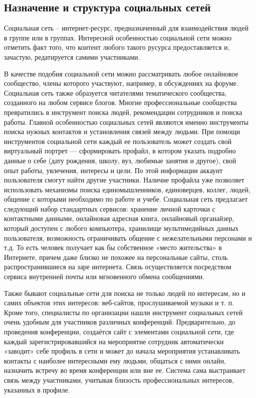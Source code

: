 \subsection{Назначение и структура социальных сетей}
\label{sec:analysis:structure}

Социальная сеть -- интернет-ресурс, предназначенный для взаимодействия людей в группе или в группах. Интересной особенностью социальной сети можно отметить факт того, что контент любого такого русурса предоставляется и, зачастую, редатируется самими участниками.

В качестве подобия социальной сети можно рассматривать любое онлайновое сообщество, члены которого участвуют, например, в обсуждениях на форуме. Социальная сеть также образуется читателями тематического сообщества, созданного на любом сервисе блогов. Многие профессиональные сообщества превратились в инструмент поиска людей, рекомендации сотрудников и поиска работы. Главной особенностью социальных сетей являются именно инструменты поиска нужных контактов и установления связей между людьми. При помощи инструментов социальной сети каждый ее пользователь может создать свой виртуальный портрет — сформировать профайл, в котором указать подробно данные о себе (дату рождения, школу, вуз, любимые занятия и другое), свой опыт работы, увлечения, интересы и цели. По этой информации аккаунт пользователя смогут найти другие участники. Наличие профайла уже позволяет использовать механизмы поиска единомышленников, единоверцев, коллег, людей, общение с которыми необходимо по работе и учебе. Социальная сеть предлагает следующий набор стандартных сервисов: хранение личной карточки с контактными данными, онлайновая адресная книга, онлайновый органайзер, который доступен с любого компьютера, хранилище мультимедийных данных пользователя, возможность ограничивать общение с нежелательными персонами и т.д. То есть человек получает как бы собственное «место жительства» в Интернете, причем даже близко не похожее на персональные сайты, столь распространившиеся на заре интернета. Связь осуществляется посредством сервиса внутренней почты или мгновенного обмена сообщениями.

Также бывают социальные сети для поиска не только людей по интересам, но и самих объектов этих интересов: веб‐сайтов, прослушиваемой музыки и т. п. Кроме того, специалисты по организации нашли инструмент социальных сетей очень удобным для участников различных конференций. Предварительно, до проведения конференции, создаётся сайт с элементами социальной сети, где каждый зарегистрировавшийся на мероприятие сотрудник автоматически «заводит» себе профиль в сети и может до начала мероприятия устанавливать контакты с наиболее интересными ему людьми, общаться с ними онлайн, назначить встречу во время конференции или вне ее. Система сама выстраивает связь между участниками, учитывая близость профессиональных интересов, указанных в профиле.

